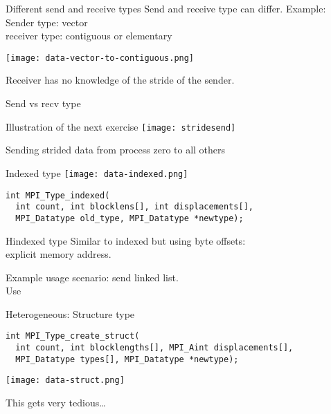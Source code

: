 \begin{numberedframe}{Different send and receive types}
  Send and receive type can differ. Example:\\
  Sender type: vector\\ receiver type: contiguous or elementary

  \texttt{[image: data-vector-to-contiguous.png]}

  Receiver has no knowledge of the stride of the sender.
\end{numberedframe}

\begin{numberedframe}{Send vs recv type}
\end{numberedframe}

\begin{numberedframe}{Illustration of the next exercise}
  \label{fig:stridesend}
  \texttt{[image: stridesend]}

  Sending strided data from process zero to all others
\end{numberedframe}

\begin{exerciseframe}[stridesend]
  
\end{exerciseframe}

\begin{exerciseframe}
  
\end{exerciseframe}

\begin{numberedframe}{Indexed type}
  \texttt{[image: data-indexed.png]}
\begin{lstlisting}
int MPI_Type_indexed(
  int count, int blocklens[], int displacements[],
  MPI_Datatype old_type, MPI_Datatype *newtype);
\end{lstlisting}
\end{numberedframe}

\begin{numberedframe}{Hindexed type}
  Similar to indexed but using byte offsets:\\
  explicit memory address.

  Example usage scenario: send linked list.\\
  Use 
\end{numberedframe}

\begin{numberedframe}{Heterogeneous: Structure type}
\begin{lstlisting}
int MPI_Type_create_struct(
  int count, int blocklengths[], MPI_Aint displacements[],
  MPI_Datatype types[], MPI_Datatype *newtype);
\end{lstlisting}
  \texttt{[image: data-struct.png]}

This gets very tedious\ldots
\end{numberedframe}


